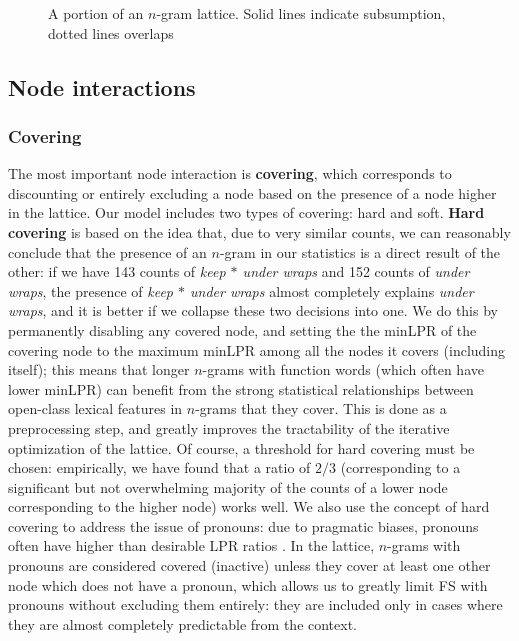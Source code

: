 \documentclass[11pt,letterpaper]{article}
\newcommand{\gap}{$*$\xspace}
\newcommand{\ex}[1]{\textit{#1}\xspace}
\newcommand{\termdef}[1]{\textbf{#1}\xspace}
\begin{document}
\begin{figure}[!tb]
\caption{A portion of an $n$-gram lattice. Solid lines indicate subsumption, dotted lines overlaps}
\label{fig:example}
\end{figure}

\subsection{Node interactions}

\subsubsection{Covering}

The most important node interaction is \termdef{covering}, which corresponds to discounting or entirely excluding a node based on the presence of a node higher in the lattice. Our model includes two types of covering: hard and soft. \termdef{Hard covering} is based on the idea that, due to very similar counts, we can reasonably conclude that the presence of an $n$-gram in our statistics is a direct result of the other: if we have 143 counts of \ex{keep \gap under wraps} and 152 counts of \ex{under wraps}, the presence of \ex{keep \gap under wraps} almost completely explains \ex{under wraps}, and it is better if we collapse these two decisions into one. We do this by permanently disabling any covered node, and setting the the minLPR of the covering node to the maximum minLPR among all the nodes it covers (including itself); this means that longer $n$-grams with function words (which often have lower minLPR) can benefit from the strong statistical relationships between open-class lexical features in $n$-grams that they cover. This is done as a preprocessing step, and greatly improves the tractability of the iterative optimization of the lattice. Of course, a threshold for hard covering must be chosen: empirically, we have found that a ratio of $2/3$ (corresponding to a significant but not overwhelming majority of the counts of a lower node corresponding to the higher node) works well.  We also use the concept of hard covering to address the issue of pronouns: due to pragmatic biases, pronouns often have higher than desirable LPR ratios \cite{Brooke15b}. In the lattice, $n$-grams with pronouns are considered covered (inactive) unless they cover at least one other node which does not have a pronoun, which allows us to greatly limit FS with pronouns without excluding them entirely: they are included only in cases where they are almost completely predictable from the context. 
\end{document}
